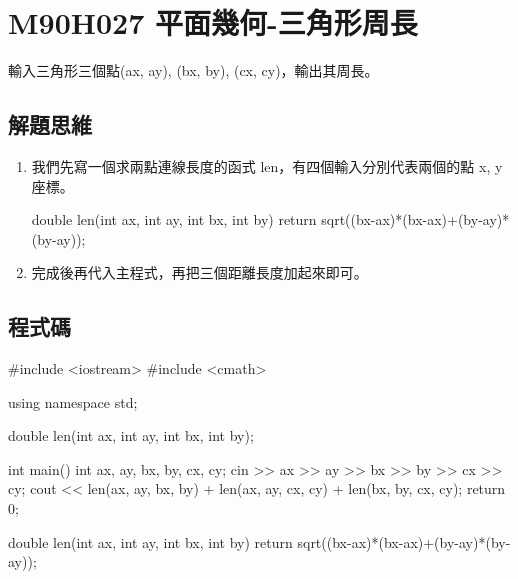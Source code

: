\section{M90H027 平面幾何-三角形周長}
輸入三角形三個點(ax, ay), (bx, by), (cx, cy)，輸出其周長。
\subsection{解題思維}

\begin{enumerate}
	\item
	我們先寫一個求兩點連線長度的函式 len，有四個輸入分別代表兩個的點 x, y 座標。
	\begin{inside}
	double len(int ax, int ay, int bx, int by) {
		return sqrt((bx-ax)*(bx-ax)+(by-ay)*(by-ay)); 
	}			
	\end{inside}
	\item
	完成後再代入主程式，再把三個距離長度加起來即可。
\end{enumerate} 

\subsection{程式碼}
\begin{cppcode}
	#include <iostream>
	#include <cmath>

	using namespace std;
	
	double len(int ax, int ay, int bx, int by);
	
	int main()
	{
		int ax, ay, bx, by, cx, cy;
		cin >> ax >> ay >> bx >> by >> cx >> cy;
		cout << len(ax, ay, bx, by) + len(ax, ay, cx, cy) + len(bx, by, cx, cy);
		return 0;
	}
	
	double len(int ax, int ay, int bx, int by) {
		return sqrt((bx-ax)*(bx-ax)+(by-ay)*(by-ay));
	}
\end{cppcode}
